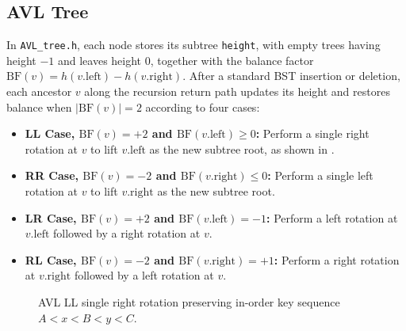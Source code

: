 \documentclass[10pt, a4paper]{article}
\newcommand{\code}[1]{\texttt{\color{primary!90!black}#1}}
\newcommand{\bfactor}[1]{\ensuremath{\mathrm{BF}(#1)}}
\newcommand{\id}[1]{\ensuremath{\mathrm{#1}}}
\begin{document}
\subsection{AVL Tree}
In \code{AVL\_tree.h}, each node stores its subtree \code{height}, with empty trees having height $-1$ and leaves height $0$, together with the balance factor $\bfactor{v} = h(v.\id{left}) - h(v.\id{right})$. After a standard BST insertion or deletion, each ancestor $v$ along the recursion return path updates its height and restores balance when $|\bfactor{v}| = 2$ according to four cases:
\begin{itemize}
  \item \textbf{\color{primary}LL Case, $\bfactor{v} = +2$ and $\bfactor{v.\id{left}} \ge 0$:} Perform a single right rotation at $v$ to lift $v.\id{left}$ as the new subtree root, as shown in .
  \item \textbf{\color{primary}RR Case, $\bfactor{v} = -2$ and $\bfactor{v.\id{right}} \le 0$:} Perform a single left rotation at $v$ to lift $v.\id{right}$ as the new subtree root.
  \item \textbf{\color{primary}LR Case, $\bfactor{v} = +2$ and $\bfactor{v.\id{left}} = -1$:} Perform a left rotation at $v.\id{left}$ followed by a right rotation at $v$.
  \item \textbf{\color{primary}RL Case, $\bfactor{v} = -2$ and $\bfactor{v.\id{right}} = +1$:} Perform a right rotation at $v.\id{right}$ followed by a left rotation at $v$.
\end{itemize}

\begin{figure}[H]
\centering
{}
\caption{AVL LL single right rotation preserving in-order key sequence $A < x < B < y < C$.}
\label{fig:avl_rotation}
\end{figure}
\end{document}
